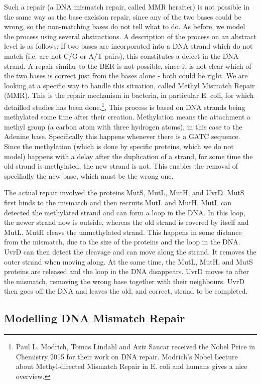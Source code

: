 \documentclass[review]{elsarticle}
\begin{document}
Such a repair (a DNA mismatch repair, called MMR herafter) is not possible in the same way as the base excision repair, since any of the two bases could be wrong, so the non-matching  bases do not tell what to do.  As before, we model the process using several abstractions. A description of the process on an abstract level is as follows: If two bases are incorporated into a DNA strand which do not match (i.e. are not C/G or A/T pairs), this constitutes a defect in the DNA strand. A repair similar to the BER is not possible, since it is not clear which of the two bases is correct just from the bases alone - both could be right. We are looking at a specific way to handle this situation, called Methyl Mismatch Repair (MMR). This is the repair mechanism in bacteria, in particular E. coli, for which detailled studies has been done.\footnote{Paul L. Modrich, Tomas Lindahl and Aziz Sancar received the Nobel Price in Chemistry 2015 for their work on DNA repair. Modrich's Nobel Lecture about Methyl-directed Mismatch Repair in E. coli and humans \cite{pmid27198632} gives a nice overview.}, This process is based on DNA strands being methylated some time after their creation. Methylation means the attachment a methyl group (a carbon atom with three hydrogen atoms), in this case to the Adenine base. Specifically this happens whenever there is a GATC sequence. Since the methylation (which is done by specific proteins, which we do not model) happens with a delay after the duplication of a strand, for some time the old strand is methylated, the new strand is not. This enables the removal of specifially the new base, which must be the wrong one.

The actual repair involved the proteins MutS, MutL, MutH, and UvrD. MutS first binds to the mismatch and then recruits MutL and MutH. MutL can detected the methylated strand and can form a loop in the DNA. In this loop, the newer strand now is outside, whereas the old strand is covered by itself and MutL. MutH cleavs the unmethylated strand. This happens in some distance from the mismatch, due to the size of the proteins and the loop in the DNA. UvrD can then detect the cleavage and can move along the strand. It removes the outer strand when moving along. At the same time, the MutL, MutH, and MutS proteins are released and the loop in the DNA disappears. UvrD moves to after the mismatch, removing the wrong base together with their neighbours. UvrD then goes off the DNA and leaves the old, and correct, strand to be completed. 

\subsection{Modelling DNA Mismatch Repair}
\end{document}
